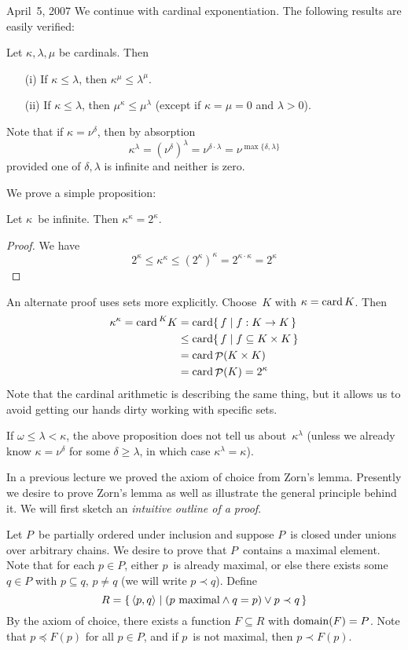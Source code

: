 \begin{lecture}{April~5, 2007}
We continue with cardinal exponentiation. The following results are easily verified:
\begin{thm}
Let \(\kappa,\lambda,\mu\) be cardinals. Then
\begin{enumerate}[itemsep=0pt]
\item[(i)] If \(\kappa\le\lambda\), then \(\kappa^{\mu}\le\lambda^{\mu}\).
\item[(ii)] If \(\kappa\le\lambda\), then \(\mu^{\kappa}\le\mu^{\lambda}\) (except if \(\kappa=\mu=0\) and \(\lambda>0\)).
\end{enumerate}
\end{thm}
\noindent Note that if \(\kappa=\nu^{\delta}\), then by absorption
\[\kappa^{\lambda}=(\nu^{\delta})^{\lambda}=\nu^{\delta\cdot\lambda}=\nu^{\max\{\delta,\lambda\}}\]
provided one of \(\delta,\lambda\) is infinite and neither is zero.

We prove a simple proposition:
\begin{prop}
Let \(\kappa\)~be infinite. Then \(\kappa^{\kappa}=2^{\kappa}\).
\end{prop}
\begin{proof}
We have
\[2^{\kappa}\le\kappa^{\kappa}\le(2^{\kappa})^{\kappa}=2^{\kappa\cdot\kappa}=2^{\kappa}\]
\end{proof}
\noindent An alternate proof uses sets more explicitly. Choose~\(K\) with \(\kappa=\operatorname{card} K\). Then
\begin{align*}
\kappa^{\kappa}=\operatorname{card}{}^{K}{K}&=\operatorname{card}\{\,f\mid f:K\to K\,\}\\
	&\le\operatorname{card}\{\,f\mid f\subseteq K\times K\,\}\\
	&=\operatorname{card}\mathop{\mathcal{P}}(K\times K)\\
	&=\operatorname{card}\mathop{\mathcal{P}}(K)=2^{\kappa}
\end{align*}
Note that the cardinal arithmetic is describing the same thing, but it allows us to avoid getting our hands dirty working with specific sets.

If \(\omega\le\lambda<\kappa\), the above proposition does not tell us about~\(\kappa^{\lambda}\) (unless we already know \(\kappa=\nu^{\delta}\) for some \(\delta\ge\lambda\), in which case \(\kappa^{\lambda}=\kappa\)).

In a previous lecture we proved the axiom of choice from Zorn's lemma. Presently we desire to prove Zorn's lemma as well as illustrate the general principle behind it. We will first sketch an \emph{intuitive outline of a proof}.

Let \(P\)~be partially ordered under inclusion and suppose \(P\)~is closed under unions over arbitrary chains. We desire to prove that \(P\)~contains a maximal element. Note that for each \(p\in P\), either \(p\)~is already maximal, or else there exists some \(q\in P\) with \(p\subseteq q\), \(p\ne q\) (we will write \(p\prec q\)). Define
\[R=\{\,\langle{p},{q}\rangle\mid (p\text{ maximal}\land q=p)\lor p\prec q\,\}\]
By the axiom of choice, there exists a function \(F\subseteq R\) with \(\operatorname{domain}(F)=P\). Note that \(p\preceq F(p)\) for all \(p\in P\), and if \(p\)~is not maximal, then \(p\prec F(p)\).


\end{lecture}
